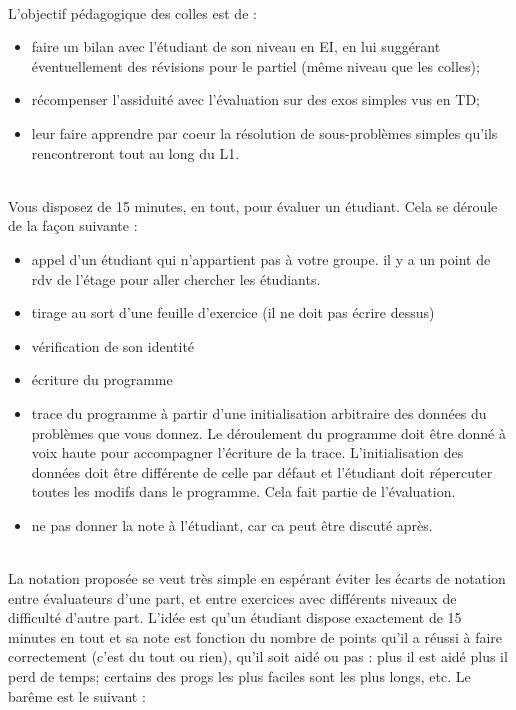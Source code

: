 
\begin{correction}
~\\
  L'objectif pédagogique des colles est de :
  \begin{itemize}
  \item faire un bilan avec l'étudiant de son niveau en EI, en lui suggérant éventuellement des révisions pour le partiel (même niveau que les colles);
  \item récompenser l'assiduité avec l'évaluation sur des exos simples vus en TD;
  \item leur faire apprendre par coeur la résolution de sous-problèmes simples qu'ils rencontreront tout au long du L1.
  \end{itemize}
~\\
Vous disposez de 15 minutes, en tout, pour évaluer un étudiant. Cela se déroule de la façon suivante :
    \begin{itemize}
    \item appel d'un étudiant qui n'appartient pas à votre groupe. il y a un point de rdv de l'étage pour aller chercher les étudiants.
    \item tirage au sort d'une feuille d'exercice (il ne doit pas écrire dessus)
    \item vérification de son identité
    \item écriture du programme
    \item trace du programme à partir d'une initialisation arbitraire des données du problèmes que vous donnez. Le déroulement du programme doit être donné à voix haute pour accompagner l'écriture de la trace. L'initialisation des données doit être différente de celle par défaut et l'étudiant doit répercuter toutes les modifs dans le programme. Cela fait partie de l'évaluation.
    \item ne pas donner la note à l'étudiant, car ca peut être discuté après.
    \end{itemize}
~\\
La notation proposée se veut très simple en espérant éviter les écarts de notation entre évaluateurs d'une part, et entre exercices avec différents niveaux de difficulté d'autre part. L'idée est qu'un étudiant dispose exactement de 15 minutes en tout et sa note est fonction du nombre de points qu'il a réussi à faire correctement (c'est du tout ou rien), qu'il soit aidé ou pas : plus il est aidé plus il perd de temps; certains des progs les plus faciles sont les plus longs, etc. Le barême est le suivant :

\end{correction}
